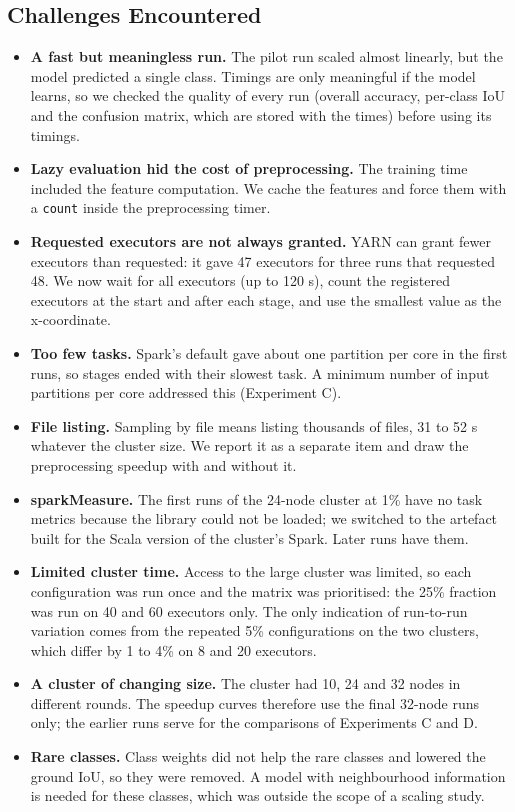 \documentclass[a4paper, 11pt]{article} %
\begin{document}
\subsection{Challenges Encountered}
\begin{itemize}
\item \textbf{A fast but meaningless run.} The pilot run scaled almost linearly, but the model predicted a single class. Timings are only meaningful if the model learns, so we checked the quality of every run (overall accuracy, per-class IoU and the confusion matrix, which are stored with the times) before using its timings.
\item \textbf{Lazy evaluation hid the cost of preprocessing.} The training time included the feature computation. We cache the features and force them with a \texttt{count} inside the preprocessing timer.
\item \textbf{Requested executors are not always granted.} YARN can grant fewer executors than requested: it gave 47 executors for three runs that requested 48. We now wait for all executors (up to 120 s), count the registered executors at the start and after each stage, and use the smallest value as the x-coordinate.
\item \textbf{Too few tasks.} Spark's default gave about one partition per core in the first runs, so stages ended with their slowest task. A minimum number of input partitions per core addressed this (Experiment C).
\item \textbf{File listing.} Sampling by file means listing thousands of files, 31 to 52 s whatever the cluster size. We report it as a separate item and draw the preprocessing speedup with and without it.
\item \textbf{sparkMeasure.} The first runs of the 24-node cluster at 1\% have no task metrics because the library could not be loaded; we switched to the artefact built for the Scala version of the cluster's Spark. Later runs have them.
\item \textbf{Limited cluster time.} Access to the large cluster was limited, so each configuration was run once and the matrix was prioritised: the 25\% fraction was run on 40 and 60 executors only. The only indication of run-to-run variation comes from the repeated 5\% configurations on the two clusters, which differ by 1 to 4\% on 8 and 20 executors.
\item \textbf{A cluster of changing size.} The cluster had 10, 24 and 32 nodes in different rounds. The speedup curves therefore use the final 32-node runs only; the earlier runs serve for the comparisons of Experiments C and D.
\item \textbf{Rare classes.} Class weights did not help the rare classes and lowered the ground IoU, so they were removed. A model with neighbourhood information is needed for these classes, which was outside the scope of a scaling study.
\end{itemize}
\end{document}
